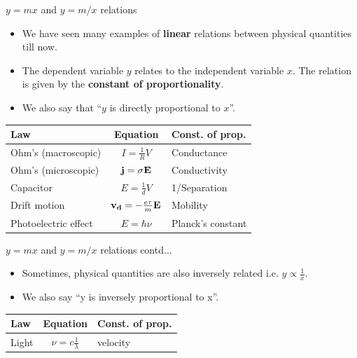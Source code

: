 \begin{frame}{\(y=mx\) and \(y= m /x\) relations}
	\begin{itemize}
		\item We have seen many examples of \textbf{linear} relations between physical quantities till now.
		\item The dependent variable \(y\) relates to the independent variable \(x\). The relation is given by the \textbf{constant of proportionality}.
		\item We also say that ``\(y\) is directly proportional to \(x\)''.
	\end{itemize}
{
		\begin{table}
		\centering
		\begin{tabular}{l c l}
			\toprule
			Law 	&	Equation 	&	Const. of prop.	\\
			\midrule
			Ohm's (macroscopic)	&	\(I = \frac{1}{R} V\)	&	Conductance	\\
			Ohm's (microscopic)	&	\(\vb{j} = \sigma \vb{E}\)	&	Conductivity \\
			Capacitor			&	\(E = \frac{1}{d} V\)	&	1/Separation	\\
			Drift motion			&	\(\vb{v_d} = -\frac{e \tau}{m} \vb{E}\)		&	Mobility	\\
			Photoelectric effect	&	\(	E = \hbar \nu\)	&	Planck's constant	\\
			\bottomrule
		\end{tabular}
	\end{table}
}
\end{frame}
%
\begin{frame}{\(y=mx\) and \(y= m /x\) relations contd...}
	\begin{itemize}
		\item Sometimes, physical quantities are also inversely related i.e. \(y \propto \tfrac{1}{x}\).
		\item We also say ``y is inversely proportional to x''.
	\end{itemize}
	{
		\begin{table}
			\centering
			\begin{tabular}{l c l}
				\toprule
				Law 	&	Equation 	&	Const. of prop.	\\
				\midrule
				Light	&	\(\nu = c\frac{1}{\lambda}\)	&	velocity	\\
				\bottomrule
			\end{tabular}
		\end{table}
	}
\end{frame}
